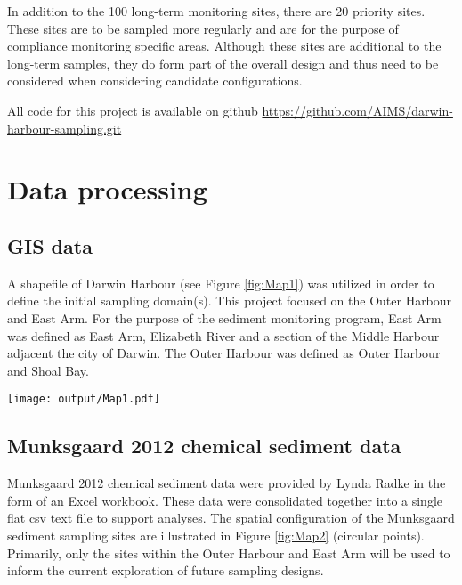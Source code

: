 \documentclass[a4paper]{article}
\let\origfigure=\figure
\let\endorigfigure=\endfigure
\renewenvironment{figure}[1][]{%
   \origfigure[H]
}{%
   \endorigfigure
}
\begin{document}
In addition to the 100 long-term monitoring sites, there are 20 priority
sites. These sites are to be sampled more regularly and are for the
purpose of compliance monitoring specific areas. Although these sites
are additional to the long-term samples, they do form part of the
overall design and thus need to be considered when considering candidate
configurations.

All code for this project is available on github
\url{https://github.com/AIMS/darwin-harbour-sampling.git}

\hypertarget{data-processing}{%
\section{Data processing}\label{data-processing}}

\hypertarget{gis-data}{%
\subsection{GIS data}\label{gis-data}}

A shapefile of Darwin Harbour (see Figure \ref{fig:Map1}) was utilized
in order to define the initial sampling domain(s). This project focused
on the Outer Harbour and East Arm. For the purpose of the sediment
monitoring program, East Arm was defined as East Arm, Elizabeth River
and a section of the Middle Harbour adjacent the city of Darwin. The
Outer Harbour was defined as Outer Harbour and Shoal Bay.

\begin{figure}
\centering\scriptsize
\texttt{[image: output/Map1.pdf]}
\caption{Map of Darwin Harbour highlighting the Outer Harbour and East
Arm sections.\label{fig:Map1}}
\end{figure}

\hypertarget{munksgaard-2012-chemical-sediment-data}{%
\subsection{Munksgaard 2012 chemical sediment
data}\label{munksgaard-2012-chemical-sediment-data}}

Munksgaard 2012 chemical sediment data were provided by Lynda Radke in
the form of an Excel workbook. These data were consolidated together
into a single flat csv text file to support analyses. The spatial
configuration of the Munksgaard sediment sampling sites are illustrated
in Figure \ref{fig:Map2} (circular points). Primarily, only the sites
within the Outer Harbour and East Arm will be used to inform the current
exploration of future sampling designs.
\end{document}
